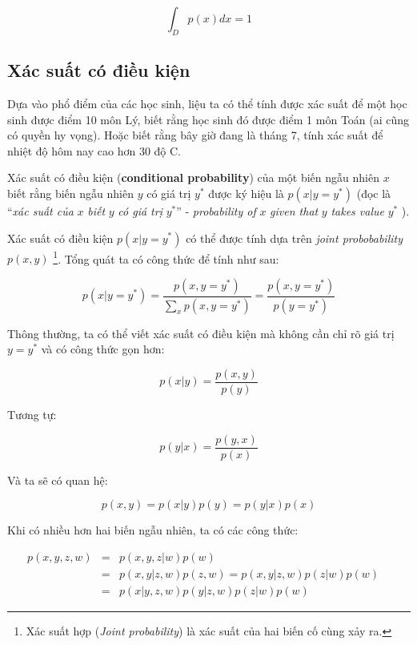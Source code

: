 \documentclass[../main-report.tex]{subfiles}
\begin{document}
\begin{equation}
\int_{D}p(x)dx=1
\end{equation}

\subsection{Xác suất có điều kiện}
Dựa vào phổ điểm của các học sinh, liệu ta có thể tính được xác suất để một học sinh được điểm 10 môn Lý, biết rằng học sinh đó được điểm 1 môn Toán (ai cũng có quyền hy vọng). Hoặc biết rằng bây giờ đang là tháng 7, tính xác suất để nhiệt độ hôm nay cao hơn 30 độ C.

Xác suất có điều kiện (\textbf{conditional probability}) của một biến ngẫu nhiên $x$ biết rằng biến ngẫu nhiên $y$ có giá trị $y^{*}$ được ký hiệu là $p(x | y = y^{*})$ (đọc là ``\textit{xác suất của} $x$ \textit{biết} $y$ \textit{có giá trị} $y^{*}$'' - \textit{probability of} $x$ \textit{given that} $y$ \textit{takes value} $y^{*}$ ).

Xác suất có điều kiện \(p(x | y = y^*)\) có thể được tính dựa trên \textit{joint probobability} \(p(x, y)\) \footnote{Xác suất hợp (\textit{Joint probability}) là xác suất của hai biến cố cùng xảy ra.}. Tổng quát ta có công thức để tính như sau:

\begin{equation}
  p(x | y = y^*) = \frac{p(x, y = y^*)}{\sum_{x} p(x, y = y^*)} = \frac{p(x, y = y^*)}{p(y = y^*)}
\end{equation}

Thông thường, ta có thể viết xác suất có điều kiện mà không cần chỉ rõ giá trị \(y = y^*\) và có công thức gọn hơn:

\begin{equation}
	p(x | y) = \frac{p(x, y)}{p(y)}
\end{equation}
  
Tương tự:

\begin{equation}
  p(y | x) = \frac{p(y, x)}{p(x)}
\end{equation}

Và ta sẽ có quan hệ:

\begin{equation} \label{eq:join_prob}
  p(x, y) = p(x | y)p(y) = p(y | x)p(x)
\end{equation}

Khi có nhiều hơn hai biến ngẫu nhiên, ta có các công thức:


\begin{eqnarray}
  p(x, y, z, w)
  & = & p(x, y, z | w) p(w) \\
  & = & p(x, y | z, w)p(z, w) = p(x, y | z, w) p(z | w) p(w) \quad \\
  & = & p(x | y, z, w)p(y | z, w)p(z | w) p(w) \label{eq:conditional_prob}
\end{eqnarray}
\end{document}
